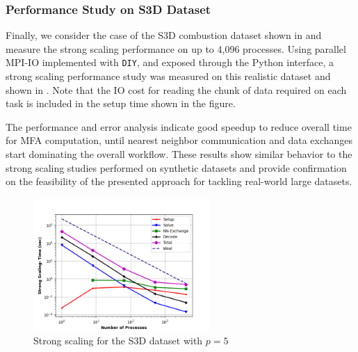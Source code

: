\subsubsection*{Performance Study on S3D Dataset}

Finally, we consider the case of the S3D combustion dataset shown in  and measure the strong scaling performance on up to 4,096 processes. Using parallel MPI-IO implemented with \texttt{DIY}, and exposed through the Python interface, a strong scaling performance study was measured on this realistic dataset and shown in . Note that the IO cost for reading the chunk of data required on each task is included in the setup time shown in the figure.

The performance and error analysis indicate good speedup to reduce overall time for MFA computation, until nearest neighbor communication and data exchanges start dominating the overall workflow. These results show similar behavior to the strong scaling studies performed on synthetic datasets and provide confirmation on the feasibility of the presented approach for tackling real-world large datasets.

\begin{figure}[htbp]
	\centering
	\includegraphics[width=0.6\textwidth]{figures/problem-s3d-strong-scaling.png}
	\caption{Strong scaling for the S3D dataset with $p=5$}
	\label{fig:s3d-strong-scaling}
\end{figure}




